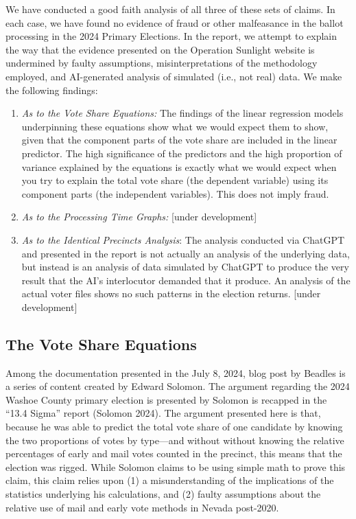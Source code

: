 \documentclass[12pt]{article}
\providecommand{\tightlist}{%
  \setlength{\itemsep}{0pt}\setlength{\parskip}{0pt}}
\begin{document}
We have conducted a good faith analysis of all three of these sets of claims. In each case, we have found no evidence of fraud or other malfeasance in the ballot processing in the 2024 Primary Elections. In the report, we attempt to explain the way that the evidence presented on the Operation Sunlight website is undermined by faulty assumptions, misinterpretations of the methodology employed, and AI-generated analysis of simulated (i.e., not real) data. We make the following findings:

\begin{enumerate}
\def\labelenumi{\arabic{enumi}.}
\tightlist
\item
  \emph{As to the Vote Share Equations:} The findings of the linear regression models underpinning these equations show what we would expect them to show, given that the component parts of the vote share are included in the linear predictor. The high significance of the predictors and the high proportion of variance explained by the equations is exactly what we would expect when you try to explain the total vote share (the dependent variable) using its component parts (the independent variables). This does not imply fraud.
\item
  \emph{As to the Processing Time Graphs:} {[}under development{]}
\item
  \emph{As to the Identical Precincts Analysis}: The analysis conducted via ChatGPT and presented in the report is not actually an analysis of the underlying data, but instead is an analysis of data simulated by ChatGPT to produce the very result that the AI's interlocutor demanded that it produce. An analysis of the actual voter files shows no such patterns in the election returns. {[}under development{]}
\end{enumerate}

\subsection{The Vote Share Equations}\label{the-vote-share-equations}

Among the documentation presented in the July 8, 2024, blog post by Beadles is a series of content created by Edward Solomon. The argument regarding the 2024 Washoe County primary election is presented by Solomon is recapped in the ``13.4 Sigma'' report (Solomon 2024). The argument presented here is that, because he was able to predict the total vote share of one candidate by knowing the two proportions of votes by type---and without without knowing the relative percentages of early and mail votes counted in the precinct, this means that the election was rigged. While Solomon claims to be using simple math to prove this claim, this claim relies upon (1) a misunderstanding of the implications of the statistics underlying his calculations, and (2) faulty assumptions about the relative use of mail and early vote methods in Nevada post-2020.
\end{document}
